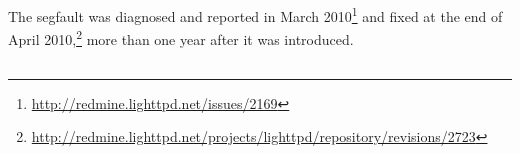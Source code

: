 The segfault was diagnosed and reported in March
2010\footnote{\url{http://redmine.lighttpd.net/issues/2169}} and fixed
at the end of April
2010,\footnote{\url{http://redmine.lighttpd.net/projects/lighttpd/repository/revisions/2723}}
more than one year after it was introduced.  



\subsection{\redis}

